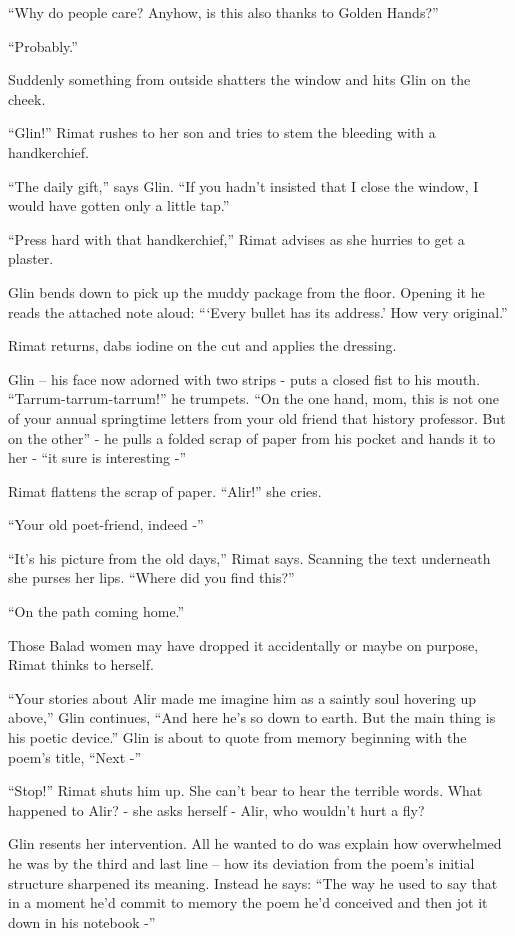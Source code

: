 \documentclass[twoside,11pt]{book}
\begin{document}
``Why do people care? Anyhow, is this also
thanks to Golden
Hands?''

``Probably.''

Suddenly something from outside shatters the window and hits Glin on
the cheek.

``Glin!'' Rimat rushes to her son and tries to stem the bleeding
with a handkerchief.

``The daily gift,'' says Glin. ``If you hadn't insisted that
I close the window, I would have gotten only a little
tap.''

``Press hard with that
handkerchief,'' Rimat advises as she hurries to get
a plaster.

Glin bends down to pick up the muddy
package from the floor. Opening it he reads the attached note aloud:
``\thinspace`Every bullet has its address.' How very
original.''

Rimat returns, dabs iodine on the cut and applies the
dressing.

Glin -- his face now adorned with two strips
- puts a closed fist
to his mouth. ``Tarrum-tarrum-tarrum!'' he trumpets. ``On the
one hand, mom, this is not one of your annual springtime letters from
your old friend that history professor. But on the
other'' - he pulls a folded scrap of paper from his pocket and hands it to her
- ``it sure is interesting -''

Rimat flattens the scrap of paper. ``Alir!'' she cries.

``Your old poet-friend, indeed -''

``It's his picture from the old days,'' Rimat says. Scanning the
text underneath she purses her lips. ``Where did you find this?''

``On the path coming home.''

Those Balad women may have dropped it accidentally or maybe on purpose, Rimat thinks to
herself.

``Your stories about Alir made me imagine him as a
saintly soul hovering up above,'' Glin continues, ``And here he's so down to earth. But the
main thing is his poetic device.'' Glin is about to quote from memory beginning with the poem's title, ``Next -''

``Stop!'' Rimat shuts him
up. She can't bear to hear the terrible words. What happened to Alir?
- she asks herself - Alir, who wouldn't  hurt a fly?

Glin resents her intervention. All he wanted to do
was explain how overwhelmed he was by the third and last line -- how
its deviation from the poem's initial structure sharpened its meaning. Instead he says: ``The way he used to say that
in a moment he'd commit to memory the poem he'd conceived and then
jot it down in his notebook -''
\end{document}

